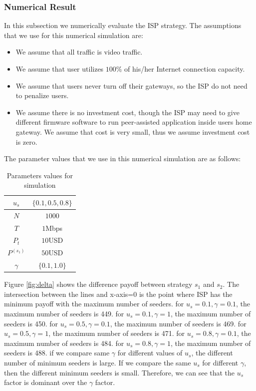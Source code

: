 \documentclass[paper]{ieice}
\begin{document}
\subsubsection{Numerical Result}

In this subsection we numerically evaluate the ISP strategy.
The assumptions that we use for this numerical simulation are:
\begin{itemize}
	\item We assume that all traffic is video traffic.
	\item We assume that user utilizes $100\%$ of his/her Internet connection capacity.  
	\item We assume that users never turn off their gateways, so the ISP do not need to penalize users.
	\item We assume there is no investment cost, though the ISP may
          need to give different firmware software to run
          peer-assisted application inside users home gateway. We
          assume that cost is very small, thus we assume investment
          cost is zero.
\end{itemize}
The parameter values that we use in this numerical simulation are as follows:
\begin{table}[hb]%
\caption{Parameters values for simulation}
\label{table:1}
\begin{center}
\begin{tabular}{c|c}
\hline
$u_s$ & $\{0.1, 0.5, 0.8\}$ \\
\hline
$N$ & $1000$\\
\hline
$T$ & $1$Mbps \\
\hline
$P_t$ & $10$USD \\
\hline
$P^{(s_1)}$ & $50$USD\\
\hline
$\gamma$ & $\{0.1,1.0\}$ \\
\hline
\end{tabular}
\end{center}
\end{table}

Figure \ref{fig:delta} shows the difference payoff between strategy $s_1$ and $s_2$.
The intersection between the lines and x-axis=0 is the point where ISP
has the minimum payoff with the maximum number of seeders.
for $u_s=0.1, \gamma=0.1$, the maximum number of seeders is 449.  
for $u_s=0.1, \gamma=1$, the maximum number of seeders is 450. 
for $u_s=0.5, \gamma=0.1$, the maximum number of seeders is 469.  
for $u_s=0.5, \gamma=1$, the maximum number of seeders is 471. 
for $u_s=0.8, \gamma=0.1$, the maximum number of seeders is 484.  
for $u_s=0.8, \gamma=1$, the maximum number of seeders is 488.
 if we compare same $\gamma$ for different values of $u_s$, the
 different number of minimum seeders is large.  
If we compare the same $u_s$ for different $\gamma$, then the different minimum seeders is small.   
Therefore, we can see that the $u_s$ factor is dominant over the $\gamma$ factor. 
\end{document}
